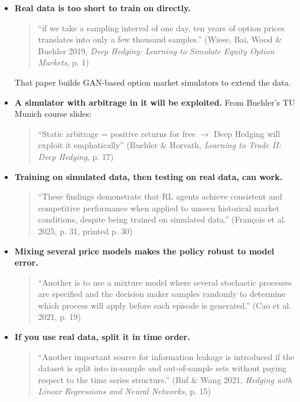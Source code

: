 \documentclass{article}
\begin{document}
\begin{itemize}

\item \textbf{Real data is too short to train on directly.}

\begin{quote}``if we take a sampling interval of one day, ten years of option prices translates into only a few thousand samples.'' (Wiese, Bai, Wood \& Buehler 2019, \emph{Deep Hedging: Learning to Simulate Equity Option Markets}, p. 1)\end{quote}

That paper builds GAN-based option market simulators to extend the data.

\item \textbf{A simulator with arbitrage in it will be exploited.} From Buehler's TU Munich course slides:

\begin{quote}``Static arbitrage = positive returns for free \ensuremath{\rightarrow} Deep Hedging will exploit it emphatically'' (Buehler \& Horvath, \emph{Learning to Trade II: Deep Hedging}, p. 17)\end{quote}

\item \textbf{Training on simulated data, then testing on real data, can work.}

\begin{quote}``These findings demonstrate that RL agents achieve consistent and competitive performance when applied to unseen historical market conditions, despite being trained on simulated data.'' (François et al. 2025, p. 31, printed p. 30)\end{quote}

\item \textbf{Mixing several price models makes the policy robust to model error.}

\begin{quote}``Another is to use a mixture model where several stochastic processes are specified and the decision maker samples randomly to determine which process will apply before each episode is generated.'' (Cao et al. 2021, p. 19)\end{quote}

\item \textbf{If you use real data, split it in time order.}

\begin{quote}``Another important source for information leakage is introduced if the dataset is split into in-sample and out-of-sample sets without paying respect to the time series structure.'' (Ruf \& Wang 2021, \emph{Hedging with Linear Regressions and Neural Networks}, p. 15)\end{quote}

\end{itemize}
\end{document}
